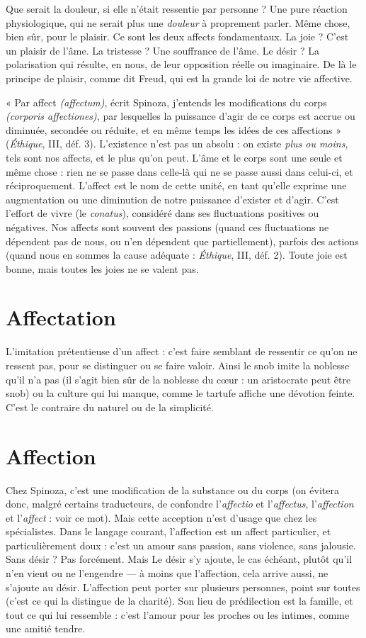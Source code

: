 Que serait la douleur, si elle n’était ressentie par personne ? Une pure réaction
physiologique, qui ne serait plus une {\it douleur} à proprement parler. Même
chose, bien sûr, pour le plaisir. Ce sont les deux affects fondamentaux. La joie ?
C’est un plaisir de l’âme. La tristesse ? Une souffrance de l’âme. Le désir ? La
polarisation qui résulte, en nous, de leur opposition réelle ou imaginaire. De là
le principe de plaisir, comme dit Freud, qui est la grande loi de notre vie affective.

« Par affect {\it (affectum)}, écrit Spinoza, j'entends les modifications du corps
{\it (corporis affectiones)}, par lesquelles la puissance d’agir de ce corps est accrue ou
diminuée, secondée ou réduite, et en même temps les idées de ces affections »
({\it Éthique}, III, déf. 3). L'existence n’est pas un absolu : on existe {\it plus ou moins},
tels sont nos affects, et le plus qu’on peut. L'âme et le corps sont une seule et
même chose : rien ne se passe dans celle-là qui ne se passe aussi dans celui-ci, et
réciproquement. L’affect est le nom de cette unité, en tant qu’elle exprime une
augmentation ou une diminution de notre puissance d’exister et d’agir. C’est
l'effort de vivre (le {\it conatus}), considéré dans ses fluctuations positives ou négatives.
Nos affects sont souvent des passions (quand ces fluctuations ne dépendent
pas de nous, ou n’en dépendent que partiellement), parfois des actions
(quand nous en sommes la cause adéquate : {\it Éthique}, III, déf. 2). Toute joie est
bonne, mais toutes les joies ne se valent pas.

\section{Affectation}
L’imitation prétentieuse d’un affect : c’est faire semblant de
ressentir ce qu'on ne ressent pas, pour se distinguer ou se
faire valoir. Ainsi le snob imite la noblesse qu’il n’a pas (il s’agit bien sûr de la
noblesse du cœur : un aristocrate peut être snob) ou la culture qui lui manque,
comme le tartufe affiche une dévotion feinte. C’est le contraire du naturel ou
de la simplicité.

\section{Affection}
Chez Spinoza, c’est une modification de la substance ou du
corps (on évitera donc, malgré certains traducteurs, de confondre
l’{\it affectio} et l’{\it affectus}, l'{\it affection} et l'{\it affect} : voir ce mot). Mais cette acception
n'est d'usage que chez les spécialistes. Dans le langage courant, l’affection est
un affect particulier, et particulièrement doux : c’est un amour sans passion,
sans violence, sans jalousie. Sans désir ? Pas forcément. Mais Le désir s’y ajoute,
le cas échéant, plutôt qu’il n’en vient ou ne l’engendre — à moins que l’affection,
cela arrive aussi, ne s'ajoute au désir.
L’affection peut porter sur plusieurs personnes, point sur toutes (c’est ce
qui la distingue de la charité). Son lieu de prédilection est la famille, et tout ce
qui lui ressemble : c’est l'amour pour les proches ou les intimes, comme une
amitié tendre.

